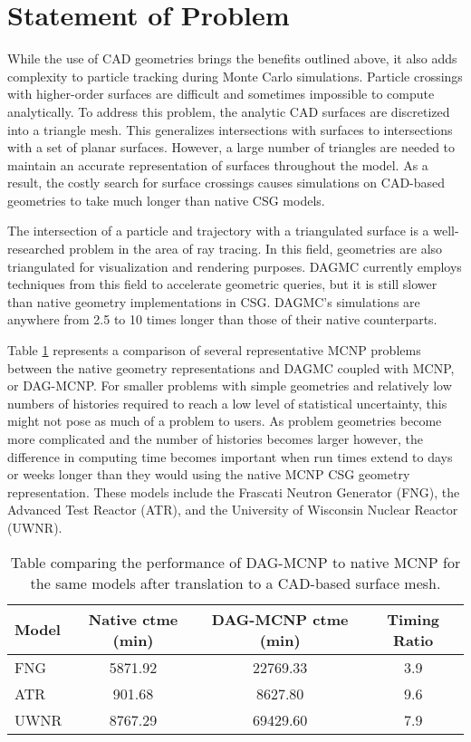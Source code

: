 \section{Statement of Problem}\label{sec:problem-statement}

While the use of CAD geometries brings the benefits outlined above, it also adds
complexity to particle tracking during Monte Carlo simulations. Particle
crossings with higher-order surfaces are difficult and sometimes impossible to
compute analytically. To address this problem, the analytic CAD surfaces are
discretized into a triangle mesh. This generalizes intersections with surfaces
to intersections with a set of planar surfaces. However, a large number of
triangles are needed to maintain an accurate representation of surfaces
throughout the model. As a result, the costly search for surface crossings
causes simulations on CAD-based geometries to take much longer than native CSG
models.

The intersection of a particle and trajectory with a triangulated surface is a
well-researched problem in the area of ray tracing. In this field, geometries
are also triangulated for visualization and rendering purposes. DAGMC currently
employs techniques from this field to accelerate geometric queries, but it is
still slower than native geometry implementations in CSG. DAGMC's simulations
are anywhere from 2.5 to 10 times longer than those of their native
counterparts.

Table \ref{dag-mcnp-benchmarks} represents a comparison of several
representative MCNP problems between the native geometry representations and
DAGMC coupled with MCNP, or DAG-MCNP. For smaller problems with simple
geometries and relatively low numbers of histories required to reach a low level
of statistical uncertainty, this might not pose as much of a problem to
users. As problem geometries become more complicated and the number of histories
becomes larger however, the difference in computing time becomes important when
run times extend to days or weeks longer than they would using the native MCNP
CSG geometry representation. These models include the Frascati Neutron Generator
(FNG), the Advanced Test Reactor (ATR), and the University of Wisconsin Nuclear
Reactor (UWNR).

\begin{table}[H]
  \centering
  \begin{tabular}{l c c c}
    \toprule
    Model & Native ctme (min) & DAG-MCNP ctme (min) & Timing Ratio \\
    \hline
    FNG   & 5871.92           & 22769.33            & 3.9   \\
    ATR   & 901.68            & 8627.80             & 9.6   \\
    UWNR  & 8767.29           & 69429.60            & 7.9   \\
    \hline
  \end{tabular}
  \caption{Table comparing the performance of DAG-MCNP to native MCNP for the
    same models after translation to a CAD-based surface mesh.}
  \label{dag-mcnp-benchmarks}  
\end{table}

